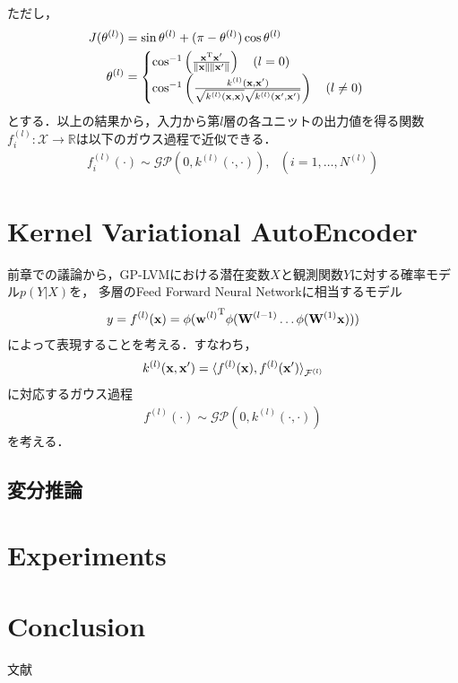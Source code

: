 \documentclass[11pt,a4j]{article}
\begin{document}
        ただし，
        \begin{align}
          J(\theta^{(l)}) &= \sin \theta^{(l)} + (\pi - \theta^{(l)}) \cos \theta^{(l)} \\
          \theta^{(l)} &=
          \begin{cases}
            \cos^{-1} \left( \frac{{\bf x}^{\mathrm{T}} {\bf x}'}{ \|{\bf x}\| \|{\bf x}'\| } \right) ~~~ (l = 0) \\
            \cos^{-1} \left( \frac{k^{(l)}( {\bf x}, {\bf x}' )}{ \sqrt{ k^{(l)}({\bf x}, {\bf x}) } \sqrt{ k^{(l)}({\bf x}', {\bf x}') } } \right) ~~~ (l \neq 0) 
          \end{cases}
        \end{align}
        とする．以上の結果から，入力から第$l$層の各ユニットの出力値を得る関数$f^{(l)}_i: \mathcal{X} \to \mathbb{R}$は以下のガウス過程で近似できる．
        \begin{align}
          f^{(l)}_i(\cdot) \sim \mathcal{GP}( 0, k^{(l)}(\cdot,\cdot) ), ~~~ (i=1,\dots,N^{(l)})
        \end{align}

  \section{Kernel Variational AutoEncoder}
    前章での議論から，GP-LVMにおける潜在変数$X$と観測関数$Y$に対する確率モデル$p(Y|X)$を，
    多層のFeed Forward Neural Networkに相当するモデル
    \begin{align}
      y = f^{(l)} ({\bf x}) = \phi( {{\bf w}^{(l)}}^{\mathrm{T}} \phi( {\bf W}^{(l-1)}  \dots \phi( {\bf W}^{(1)} {\bf x}) ) )
    \end{align}
    によって表現することを考える．すなわち，
    \begin{align}
      k^{(l)}( {\bf x}, {\bf x}' ) = { \langle f^{(l)} ({\bf x}), f^{(l)} ({\bf x}') \rangle }_{\mathcal{F}^{(l)}}
    \end{align}
    に対応するガウス過程
    \begin{align}
      f^{(l)}(\cdot) \sim \mathcal{GP}(0, k^{(l)}(\cdot,\cdot))
    \end{align}
    を考える．

    \subsection{変分推論}

  \section{Experiments}
  \section{Conclusion}
    文献\cite{Hinton1995BayesianLF}
    \cite{DLGP2018} \cite{KMDL2009} \cite{LawrenceGPLVM2004} \cite{LawrenceGPLVM2005}
    \cite{SparseGP2006} \cite{VariationalSparseGP2009} \cite{BayesGP2010}
    \cite{GPBIGDATA2013}


  
\end{document}
